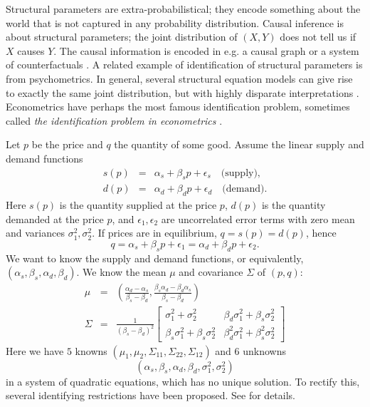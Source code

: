 Structural parameters are extra-probabilistical; they encode something
about the world that is not captured in any probability distribution.
Causal inference is about structural parameters; the joint distribution
of $(X,Y)$ does not tell us if $X$ causes $Y$. The causal information
is encoded in e.g. a causal graph \parencite{Pearl2009-zf} or a system
of counterfactuals \parencite[Chapter 4]{Pearl2016-tc}. A related example
of identification of structural parameters is from psychometrics.
In general, several structural equation models can give rise to exactly
the same joint distribution, but with highly disparate interpretations
\parencite{Raykov2001-ap}. Econometrics have perhaps the most famous
identification problem, sometimes called \textit{the identification problem in econometrics} \parencite{Manski1999-ab}.
\begin{example}
 Let $p$ be the price and $q$ the quantity of some good. Assume
the linear supply and demand functions
\begin{eqnarray*}
s(p) & = & \alpha_{s}+\beta_{s}p+\epsilon_{s}\quad\textrm{(supply)},\\
d(p) & = & \alpha_{d}+\beta_{d}p+\epsilon_{d}\quad\textrm{(demand).}
\end{eqnarray*}
Here $s(p)$ is the quantity supplied at the price $p$, $d(p)$ is
the quantity demanded at the price $p$, and $\epsilon_{1},\epsilon_{2}$
are uncorrelated error terms with zero mean and variances $\sigma_{1}^{2},\sigma_{2}^{2}$.
If prices are in equilibrium, $q=s(p)=d(p)$, hence
\[
q=\alpha_{s}+\beta_{s}p+\epsilon_{1}=\alpha_{d}+\beta_{d}p+\epsilon_{2}.
\]
We want to know the supply and demand functions, or equivalently,
$(\alpha_{s},\beta_{s},\alpha_{d},\beta_{d})$. We know the mean $\mu$
and covariance $\Sigma$ of $(p,q)$:
\begin{eqnarray*}
\mu & = & \left(\frac{\alpha_{d}-\alpha_{s}}{\beta_{s}-\beta_{d}},\frac{\beta_{s}\alpha_{d}-\beta_{d}\alpha_{s}}{\beta_{s}-\beta_{d}}\right)\\
\Sigma & = & \frac{1}{(\beta_{s}-\beta_{d})^{2}}\left[\begin{array}{cc}
\sigma_{1}^{2}+\sigma_{2}^{2} & \beta_{d}\sigma_{1}^{2}+\beta_{s}\sigma_{2}^{2}\\
\beta_{s}\sigma_{1}^{2}+\beta_{s}\sigma_{2}^{2} & \beta_{d}^{2}\sigma_{1}^{2}+\beta_{s}^{2}\sigma_{2}^{2}
\end{array}\right]
\end{eqnarray*}
Here we have $5$ knowns $(\mu_{1},\mu_{2},\Sigma_{11},\Sigma_{22},\Sigma_{12})$
and $6$ unknowns $$(\alpha_{s},\beta_{s},\alpha_{d},\beta_{d},\sigma_{1}^{2},\sigma_{2}^{2})$$
in a system of quadratic equations, which has no
unique solution. To rectify this, several identifying restrictions have been proposed. See \textcite[Chapter 6]{Manski1999-ab} for details.
\end{example}